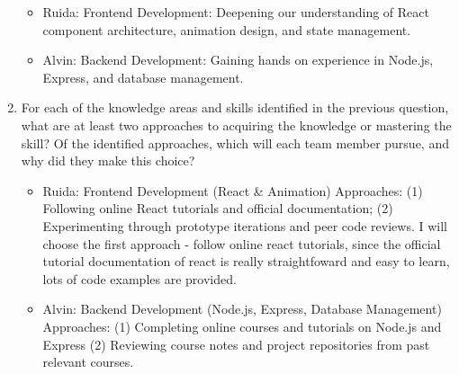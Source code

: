\begin{enumerate}
\begin{itemize}
\item Ruida: Frontend Development: Deepening our understanding of React component architecture, animation design, and state management.
\item Alvin: Backend Development: Gaining hands on experience in Node.js, Express, and database management.
\end{itemize}
  \item For each of the knowledge areas and skills identified in the previous
  question, what are at least two approaches to acquiring the knowledge or
  mastering the skill?  Of the identified approaches, which will each team
  member pursue, and why did they make this choice?
	\begin{itemize}
	\item Ruida: Frontend Development (React \& Animation)
	Approaches: (1) Following online React tutorials and official documentation; (2) Experimenting through prototype 	iterations and peer code reviews. I will choose the first approach - follow online react tutorials,  since the official tutorial documentation of react is really straightfoward and easy to learn, lots of code examples are provided.
	\end{itemize}
  \begin{itemize}
  \item Alvin: Backend Development (Node.js, Express, Database Management)
  Approaches: (1) Completing online courses and tutorials on Node.js and Express (2) Reviewing course notes and project repositories from past relevant courses.
  \end{itemize}
\end{enumerate}
